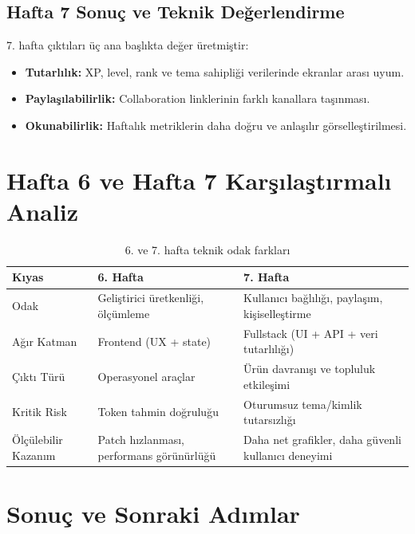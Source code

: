 \documentclass[12pt,a4paper]{article}
\begin{document}
\subsection{Hafta 7 Sonuç ve Teknik Değerlendirme}

7. hafta çıktıları üç ana başlıkta değer üretmiştir:
\begin{itemize}[leftmargin=*]
  \item \textbf{Tutarlılık:} XP, level, rank ve tema sahipliği verilerinde ekranlar arası uyum.
  \item \textbf{Paylaşılabilirlik:} Collaboration linklerinin farklı kanallara taşınması.
  \item \textbf{Okunabilirlik:} Haftalık metriklerin daha doğru ve anlaşılır görselleştirilmesi.
\end{itemize}

\newpage
\section{Hafta 6 ve Hafta 7 Karşılaştırmalı Analiz}

\begin{table}[h!]
  \centering\small
  \begin{tabular}{@{} P{2.8cm} P{4.9cm} P{4.9cm} @{}}
    \toprule
    \textbf{Kıyas} & \textbf{6. Hafta} & \textbf{7. Hafta} \\
    \midrule
    Odak & Geliştirici üretkenliği, ölçümleme & Kullanıcı bağlılığı, paylaşım, kişiselleştirme \\
    Ağır Katman & Frontend (UX + state) & Fullstack (UI + API + veri tutarlılığı) \\
    Çıktı Türü & Operasyonel araçlar & Ürün davranışı ve topluluk etkileşimi \\
    Kritik Risk & Token tahmin doğruluğu & Oturumsuz tema/kimlik tutarsızlığı \\
    Ölçülebilir Kazanım & Patch hızlanması, performans görünürlüğü & Daha net grafikler, daha güvenli kullanıcı deneyimi \\
    \bottomrule
  \end{tabular}
  \caption{6. ve 7. hafta teknik odak farkları}
\end{table}

\section{Sonuç ve Sonraki Adımlar}
\end{document}
